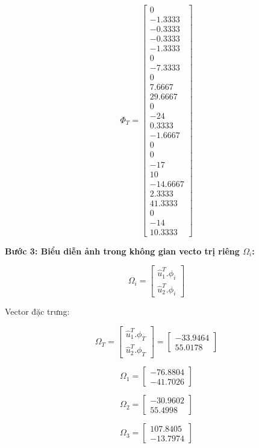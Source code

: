 \[
\Phi_T = \begin{bmatrix}
0 \\
-1.3333 \\
-0.3333 \\
-0.3333 \\
-1.3333 \\
0 \\
-7.3333 \\
0 \\
7.6667 \\
29.6667 \\
0 \\
-24 \\
0.3333 \\
-1.6667 \\
0 \\
0 \\
-17 \\
10 \\
-14.6667 \\
2.3333 \\
41.3333 \\
0 \\
-14 \\
10.3333
\end{bmatrix}
\]

\textbf{Bước 3: Biểu diễn ảnh trong không gian vecto trị riêng $\Omega_i$:}

\[
\Omega_i = \begin{bmatrix}
\hat{u}_1^T . \phi_i \\
\hat{u}_2^T . \phi_i
\end{bmatrix}
\]

Vector đặc trưng:

\[
\Omega_T = \begin{bmatrix}
\hat{u}_1^T . \phi_T \\
\hat{u}_2^T . \phi_T
\end{bmatrix} = \begin{bmatrix}
-33.9464 \\
55.0178
\end{bmatrix}
\]

\[
\Omega_1 = \begin{bmatrix}
-76.8804 \\
-41.7026
\end{bmatrix}
\]

\[
\Omega_2 = \begin{bmatrix}
-30.9602 \\
55.4998
\end{bmatrix}
\]

\[
\Omega_3 = \begin{bmatrix}
107.8405 \\
-13.7974
\end{bmatrix}
\]

